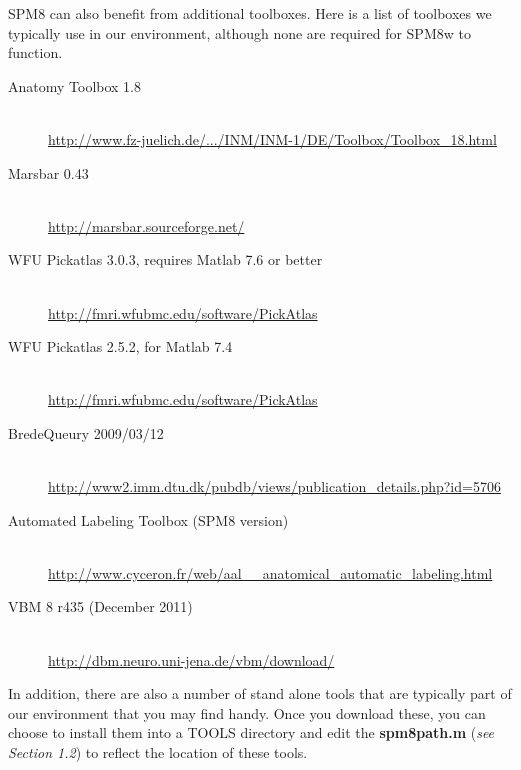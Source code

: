 \documentclass[12pt]{article}
\begin{document}
SPM8 can also benefit from additional toolboxes. Here is a list of toolboxes we typically use in our environment, although none are required for SPM8w to function.
 
\begin{description}
\item[Anatomy Toolbox 1.8] \hfill \\ 
\href{http://www.fz-juelich.de/SharedDocs/Downloads/INM/INM-1/DE/Toolbox/Toolbox_18.html}{http://www.fz-juelich.de/.../INM/INM-1/DE/Toolbox/Toolbox\_18.html}
\item[Marsbar 0.43] \hfill \\ 
\href{http://marsbar.sourceforge.net/}{http://marsbar.sourceforge.net/}
\item[WFU Pickatlas 3.0.3, requires Matlab 7.6 or better] \hfill \\ \href{http://fmri.wfubmc.edu/software/PickAtlas}{http://fmri.wfubmc.edu/software/PickAtlas}
\item[WFU Pickatlas 2.5.2, for Matlab 7.4] \hfill \\ \href{http://fmri.wfubmc.edu/software/PickAtlas}{http://fmri.wfubmc.edu/software/PickAtlas}
\item[BredeQueury 2009/03/12] \hfill \\ 
\href{http://www2.imm.dtu.dk/pubdb/views/publication_details.php?id=5706}{http://www2.imm.dtu.dk/pubdb/views/publication\_details.php?id=5706}
\item[Automated Labeling Toolbox (SPM8 version)] \hfill \\ \href{http://www.cyceron.fr/web/aal__anatomical_automatic_labeling.html}{http://www.cyceron.fr/web/aal\_\_anatomical\_automatic\_labeling.html}
\item[VBM 8 r435 (December 2011)] \hfill \\ 
\href{http://dbm.neuro.uni-jena.de/vbm/download/}{http://dbm.neuro.uni-jena.de/vbm/download/}
\end{description}

In addition, there are also a number of stand alone tools that are typically part of our environment that you may find handy. Once you download these, you can choose to install them into a TOOLS directory and edit the \textbf{spm8path.m} (\emph{see Section 1.2}) to reflect the location of these tools. 
 
\end{document}
